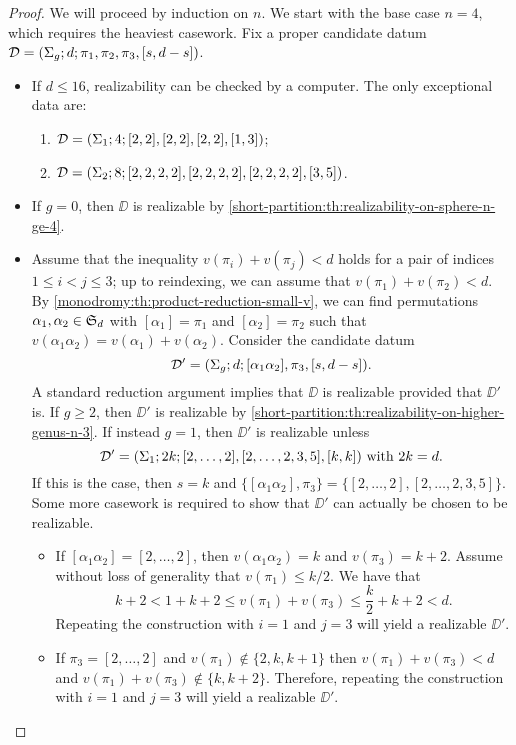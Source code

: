 \begin{proof}
We will proceed by induction on $n$. We start with the base case $n=4$, which requires the heaviest casework. Fix a proper candidate datum $\mathcal{D}=(\Sigma_{g};d;\pi_1,\pi_2,\pi_3,[s,d-s])$.
\begin{itemize}
\item If $d\le 16$, realizability can be checked by a computer. The only exceptional data are:
\begin{enumerate}[(1)]
\item $\mathcal{D}=(\Sigma_{1};4;[2, 2],[2, 2],[2, 2],[1, 3])$;
\item $\mathcal{D}=(\Sigma_{2};8;[2, 2, 2, 2],[2, 2, 2, 2],[2, 2, 2, 2],[3, 5])$.
\end{enumerate}
\item If $g=0$, then $\DD$ is realizable by \cref{short-partition:th:realizability-on-sphere-n-ge-4}.
\item Assume that the inequality $v(\pi_i)+v(\pi_j)<d$ holds for a pair of indices $1\le i<j\le 3$; up to reindexing, we can assume that $v(\pi_1)+v(\pi_2)<d$. By \cref{monodromy:th:product-reduction-small-v}, we can find permutations $\alpha_1,\alpha_2\in\symgroup[d]$ with $[\alpha_1]=\pi_1$ and $[\alpha_2]=\pi_2$ such that $v(\alpha_1\alpha_2)=v(\alpha_1)+v(\alpha_2)$. Consider the candidate datum
\[
\mathcal{D}'=(\Sigma_{g};d;[\alpha_1\alpha_2],\pi_3,[s,d-s]).
\]
A standard reduction argument implies that $\DD$ is realizable provided that $\DD'$ is. If $g\ge 2$, then $\DD'$ is realizable by \cref{short-partition:th:realizability-on-higher-genus-n-3}. If instead $g=1$, then $\DD'$ is realizable unless
\[
\text{$\mathcal{D}'=(\Sigma_{1};2k;[2,\ldots,2],[2,\ldots,2,3,5],[k,k])$ with $2k=d$.}
\]
If this is the case, then $s=k$ and $\{[\alpha_1\alpha_2],\pi_3\}=\{[2,\ldots,2],[2,\ldots,2,3,5]\}$. Some more casework is required to show that $\DD'$ can actually be chosen to be realizable.
\begin{itemize}
\item If $[\alpha_1\alpha_2]=[2,\ldots,2]$, then $v(\alpha_1\alpha_2)=k$ and $v(\pi_3)=k+2$. Assume without loss of generality that $v(\pi_1)\le k/2$. We have that
\[
k+2<1+k+2\le v(\pi_1)+v(\pi_3)\le \frac{k}{2}+k+2<d.
\]
Repeating the construction with $i=1$ and $j=3$ will yield a realizable $\DD'$.
\item If $\pi_3=[2,\ldots,2]$ and $v(\pi_1)\not\in\{2,k,k+1\}$ then $v(\pi_1)+v(\pi_3)<d$ and $v(\pi_1)+v(\pi_3)\not\in\{k,k+2\}$. Therefore, repeating the construction with $i=1$ and $j=3$ will yield a realizable $\DD'$.

\end{itemize}
\end{itemize}
\end{proof}
